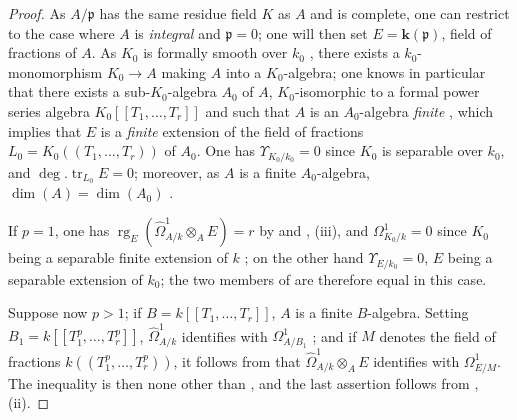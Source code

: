 \begin{proof}
As $A/\mathfrak{p}$ has the same residue field $K$ as $A$ and is complete, one can restrict to the case where $A$ is \emph{integral} and $\mathfrak{p}=0$; one will then set $E=\boldsymbol{k}(\mathfrak{p})$, field of fractions of $A$.
As $K_0$ is formally smooth over $k_0$ , there exists a $k_0$-monomorphism $K_0\to A$ making $A$ into a $K_0$-algebra; one knows in particular that there exists a sub-$K_0$-algebra $A_0$ of $A$, $K_0$-isomorphic to a formal power series algebra $K_0[[T_1,\ldots,T_r]]$ and such that $A$ is an $A_0$-algebra \emph{finite} , which implies that $E$ is a \emph{finite} extension of the field of fractions $L_0=K_0((T_1,\ldots,T_r))$ of $A_0$.
One has $\Upsilon_{K_0/k_0}=0$ since $K_0$ is separable over $k_0$, and $\deg.\operatorname{tr}_{L_0}E=0$; moreover, as $A$ is a finite $A_0$-algebra, $\dim(A)=\dim(A_0)$ .

If $p=1$, one has $\operatorname{rg}_E(\widehat{\Omega}^1_{A/k}\otimes_A E)=r$ by  and , (iii), and $\Omega^1_{K_0/k}=0$ since $K_0$ being a separable finite extension of $k$ ; on the other hand $\Upsilon_{E/k_0}=0$, $E$ being a separable extension of $k_0$; the two members of  are therefore equal in this case.

Suppose now $p>1$; if $B=k[[T_1,\ldots,T_r]]$, $A$ is a finite $B$-algebra. Setting $B_1=k[[T_1^p,\ldots,T_r^p]]$, $\widehat{\Omega}^1_{A/k}$ identifies with $\Omega^1_{A/B_1}$ ; and if $M$ denotes the field of fractions $k((T_1^p,\ldots,T_r^p))$, it follows from  that $\widehat{\Omega}^1_{A/k}\otimes_A E$ identifies with $\Omega^1_{E/M}$. The inequality  is then none other than , and the last assertion follows from , (ii).
\end{proof}
